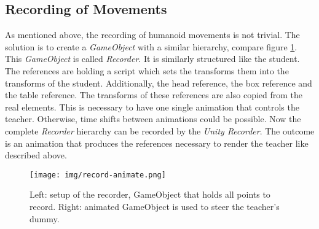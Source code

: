 \subsection{Recording of Movements}
As mentioned above, the recording of humanoid movements is not trivial. The solution is to create a \textit{GameObject} with a similar hierarchy, compare figure \ref{fig:record_animation}. This \textit{GameObject} is called \textit{Recorder}. It is similarly structured like the student. The references are holding a script which sets the transforms them into the transforms of the student. Additionally, the head reference, the box reference and the table reference. The transforms of these references are also copied from the real elements. This is necessary to have one single animation that controls the teacher. Otherwise, time shifts between animations could be possible. Now the complete \textit{Recorder} hierarchy can be recorded by the \textit{Unity Recorder}. The outcome is an animation that produces the references necessary to render the teacher like described above.
\begin{figure}
	\centering
	\texttt{[image: img/record-animate.png]}
	\caption{Left: setup of the recorder, GameObject that holds all points to record. Right: animated GameObject is used to steer the teacher's dummy.}
	\label{fig:record_animation}
\end{figure}

